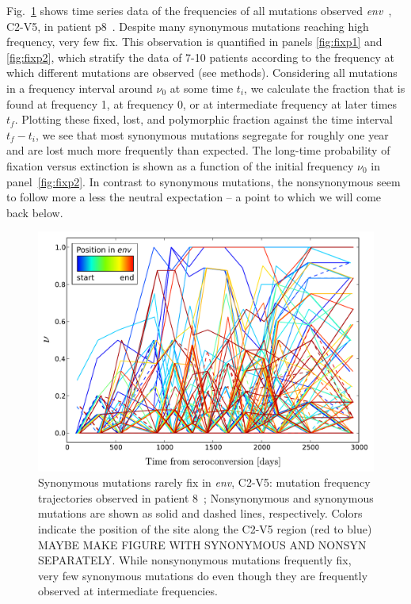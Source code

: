 \documentclass[rmp, twocolumn]{revtex4}
\newcommand{\env}{\textit{env}}
\newcommand{\FIG}[1]{Fig.~\ref{fig:#1}}
\begin{document}
\FIG{aft} shows time series data of the frequencies of all mutations observed
\env~, C2-V5, in patient p8~\citep{shankarappa_consistent_1999,
liu_selection_2006}. Despite many synonymous mutations reaching high frequency,
very few fix. This observation is quantified in panels \ref{fig:fixp1} and
\ref{fig:fixp2}, which stratify the data of 7-10 patients according to the
frequency at which different mutations are observed (see methods). Considering
all mutations in a frequency interval around $\nu_0$ at some time $t_i$, we
calculate the fraction that is found at frequency 1, at frequency 0, or at
intermediate frequency at later times $t_f$. Plotting these fixed, lost, and
polymorphic fraction against the time interval $t_f-t_i$, we see that most
synonymous mutations segregate for roughly one year and are lost much more
frequently than expected. The long-time probability of fixation versus
extinction is shown as a function of the initial frequency $\nu_0$ in
panel~\ref{fig:fixp2}. In contrast to synonymous mutations, the nonsynonymous
seem to follow more a less the neutral expectation -- a point to which we will
come back below. 
\begin{figure}
\begin{center}
\includegraphics[width=\linewidth]{Shankarappa_allele_freqs_trajectories_syn_nonsynp8}
\caption{Synonymous mutations rarely fix in \env, C2-V5: mutation frequency
 trajectories observed in patient 8~\cite{shankarappa_consistent_1999};
 Nonsynonymous and synonymous mutations are shown as solid and dashed lines,
 respectively. Colors indicate the position of the site along the C2-V5 region
 (red to blue) MAYBE MAKE FIGURE WITH SYNONYMOUS AND NONSYN
 SEPARATELY. While nonsynonymous mutations frequently fix, very few synonymous
mutations do even though they are frequently observed at intermediate
frequencies.}
\label{fig:aft}
\end{center}
\end{figure}
\end{document}
